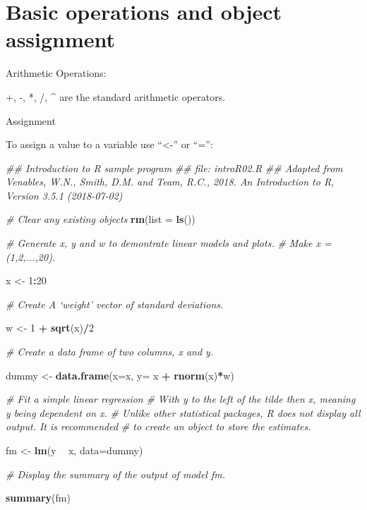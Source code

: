 \documentclass[]{book}
\newenvironment{Shaded}{\begin{snugshade}}{\end{snugshade}}
\newcommand{\CommentTok}[1]{\textcolor[rgb]{0.56,0.35,0.01}{\textit{#1}}}
\newcommand{\DataTypeTok}[1]{\textcolor[rgb]{0.13,0.29,0.53}{#1}}
\newcommand{\DecValTok}[1]{\textcolor[rgb]{0.00,0.00,0.81}{#1}}
\newcommand{\KeywordTok}[1]{\textcolor[rgb]{0.13,0.29,0.53}{\textbf{#1}}}
\newcommand{\NormalTok}[1]{#1}
\newcommand{\OperatorTok}[1]{\textcolor[rgb]{0.81,0.36,0.00}{\textbf{#1}}}
\newcommand{\StringTok}[1]{\textcolor[rgb]{0.31,0.60,0.02}{#1}}
\begin{document}
\hypertarget{basic-operations-and-object-assignment}{%
\section{Basic operations and object assignment}\label{basic-operations-and-object-assignment}}

Arithmetic Operations:

+, -, *, /, \^{} are the standard arithmetic operators.

Assignment

To assign a value to a variable use ``\textless-'' or ``='':

\begin{Shaded}
\begin{Highlighting}[]
\CommentTok{## Introduction to R sample program }
\CommentTok{## file: introR02.R}
\CommentTok{## Adapted from Venables, W.N., Smith, D.M. and Team, R.C., 2018. An Introduction to R, Version 3.5.1 (2018-07-02)}


\CommentTok{# Clear any existing objects }
\KeywordTok{rm}\NormalTok{(}\DataTypeTok{list =} \KeywordTok{ls}\NormalTok{())}

\CommentTok{# Generate x, y and w to demontrate linear models and plots.}
\CommentTok{# Make x = (1,2,...,20).}

\NormalTok{x <-}\StringTok{ }\DecValTok{1}\OperatorTok{:}\DecValTok{20}

\CommentTok{# Create A ‘weight’ vector of standard deviations.}

\NormalTok{w <-}\StringTok{ }\DecValTok{1} \OperatorTok{+}\StringTok{ }\KeywordTok{sqrt}\NormalTok{(x)}\OperatorTok{/}\DecValTok{2}

\CommentTok{# Create a data frame of two columns, x and y.}

\NormalTok{dummy <-}\StringTok{ }\KeywordTok{data.frame}\NormalTok{(}\DataTypeTok{x=}\NormalTok{x, }\DataTypeTok{y=}\NormalTok{ x }\OperatorTok{+}\StringTok{ }\KeywordTok{rnorm}\NormalTok{(x)}\OperatorTok{*}\NormalTok{w)}

\CommentTok{# Fit a simple linear regression }
\CommentTok{# With y to the left of the tilde then x, meaning y being dependent on x.}
\CommentTok{# Unlike other statistical packages, R does not display all output.  It is recommended}
\CommentTok{# to create an object to store the estimates.}

\NormalTok{fm <-}\StringTok{ }\KeywordTok{lm}\NormalTok{(y }\OperatorTok{~}\StringTok{ }\NormalTok{x, }\DataTypeTok{data=}\NormalTok{dummy) }

\CommentTok{# Display the summary of the output of model fm.}

\KeywordTok{summary}\NormalTok{(fm)}
\end{Highlighting}
\end{Shaded}
\end{document}
